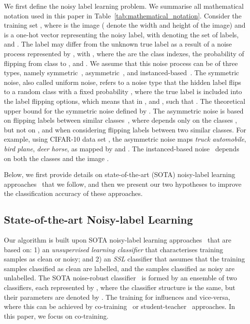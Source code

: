 \documentclass[review]{elsarticle}
\begin{document}
We first define the noisy label learning problem. We summarise all mathematical notation used in this paper in Table~\ref{tab:mathematical_notation}.
Consider the training set , where  is the  image ( denote the width and height of the image) and  is a one-hot vector representing the noisy label, with  denoting the set of labels, and . 
The label  may differ from the unknown true label  as a result of a noise process represented by , with ,
where the  are the class indexes,  the probability of flipping from class  to , and . We assume that this noise process can be of three types, namely symmetric~\cite{kim2019nlnl}, asymmetric~\cite{patrini2017making}, and instanced-based~\cite{rog}.
The symmetric noise, also called uniform noise, refers to a noise type that the hidden label flips to a random class with a fixed probability , where the true label is included into the label flipping options, which means that in , and , such that . The theoretical upper bound for the symmetric noise defined by . 
The asymmetric noise is based on flipping labels between similar classes~\cite{patrini2017making}, where  depends only on the classes , but not on , and  when considering flipping labels between two similar classes.  For example, using  CIFAR-10 data set \cite{krizhevsky2009learning}, the asymmetric noise maps \emph{truck}  \emph{automobile}, \emph{bird}  \emph{plane}, \emph{deer}  \emph{horse}, as mapped by \cite{zhang2018generalized} and . 
The instanced-based noise~\cite{rog} depends on both the classes  and the image .

Below, we first provide details on state-of-the-art (SOTA) noisy-label learning approaches~\cite{li2020dividemix, ding2018semi, kong2019recycling} that we follow, and then we present our two hypotheses to improve the classification accuracy of these approaches.

\subsection{State-of-the-art Noisy-label Learning}

Our algorithm is built upon SOTA noisy-label learning approaches~\cite{li2020dividemix, ding2018semi, kong2019recycling} that are based on: 1) an \textit{unsupervised learning classifier} that characterises training samples as clean or noisy; and 2) an \textit{SSL} classifier that assumes that the training samples classified as clean are labelled, and the samples classified as noisy are unlabelled.
The SOTA noise-robust classifier~\cite{li2020dividemix,nguyen2019self} is formed by an ensemble of two classifiers, each represented by , where the classifier structure is the same, but their parameters are denoted by .  The training for  influences  and vice-versa, where this can be achieved by co-training~\cite{li2020dividemix} or student-teacher~\cite{nguyen2019self} approaches. In this paper, we focus on co-training.
\end{document}
